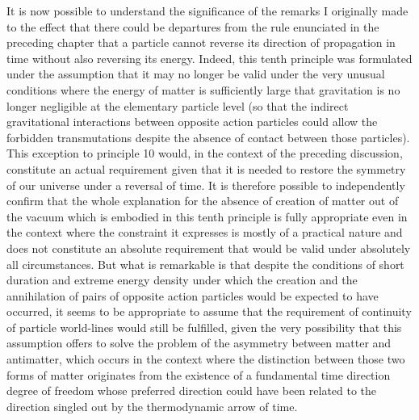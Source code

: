 \documentclass[notitlepage,12pt]{report}
\begin{document}
It is now possible to understand the significance of the remarks I originally made to the effect that there could be departures from the rule enunciated in the preceding chapter that a particle cannot reverse its direction of propagation in time without also reversing its energy. Indeed, this tenth principle was formulated under the assumption that it may no longer be valid under the very unusual conditions where the energy of matter is sufficiently large that gravitation is no longer negligible at the elementary particle level (so that the indirect gravitational interactions between opposite action particles could allow the forbidden transmutations despite the absence of contact between those particles). This exception to principle 10 would, in the context of the preceding discussion, constitute an actual requirement given that it is needed to restore the symmetry of our universe under a reversal of time. It is therefore possible to independently confirm that the whole explanation for the absence of creation of matter out of the vacuum which is embodied in this tenth principle is fully appropriate even in the context where the constraint it expresses is mostly of a practical nature and does not constitute an absolute requirement that would be valid under absolutely all circumstances. But what is remarkable is that despite the conditions of short duration and extreme energy density under which the creation and the annihilation of pairs of opposite action particles would be expected to have occurred, it seems to be appropriate to assume that the requirement of continuity of particle world-lines would still be fulfilled, given the very possibility that this assumption offers to solve the problem of the asymmetry between matter and antimatter, which occurs in the context where the distinction between those two forms of matter originates from the existence of a fundamental time direction degree of freedom whose preferred direction could have been related to the direction singled out by the thermodynamic arrow of time.
\end{document}
